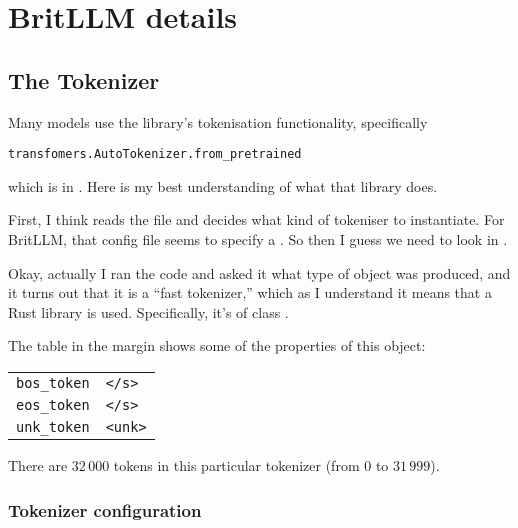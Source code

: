 \documentclass[11pt, a4paper]{article}
\begin{document}
\appendix

\section{BritLLM details}

\subsection{The Tokenizer}

Many models use the  library's tokenisation
functionality, specifically
\begin{verbatim}
transfomers.AutoTokenizer.from_pretrained
\end{verbatim}
which is in . Here is my best
understanding of what that library does.

First, I think  reads the file
 and decides what kind of tokeniser to
instantiate. For BritLLM, that config file seems to specify a
. So then I guess we need to look in
.

Okay, actually I ran the code and asked it what type of object was
produced, and it turns out that it is a ``fast tokenizer,'' which as I
understand it means that a Rust library is used. Specifically, it's of
class
. 

The table in the margin shows some of the properties of this object:
\begin{margintable}
\begin{tabular}{ll}
  \toprule
  \verb|bos_token| & \verb|</s>| \\
  \verb|eos_token| & \verb|</s>| \\
  \verb|unk_token| & \verb|<unk>| \\
  \bottomrule
\end{tabular}
\end{margintable}

                      
                      
                       
                      
  
There are $32\,000$ tokens in this particular tokenizer (from $0$ to $31\,999$). 

\subsubsection{Tokenizer configuration}
\end{document}
